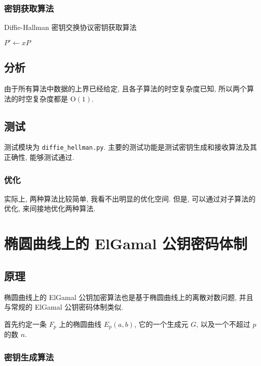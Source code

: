 \documentclass[12pt,a4paper]{article}
\begin{document}
\subsubsection*{密钥获取算法}

\begin{algorithm}[H]
\caption{Diffie-Hallman 密钥交换协议密钥获取算法}

$ P' \leftarrow x P $

\end{algorithm}

\subsection*{分析}

由于所有算法中数据的上界已经给定, 且各子算法的时空复杂度已知, 所以两个算法的时空复杂度都是 $ \mathrm{O}(1) $. 

\subsection*{测试}

测试模块为 \verb|diffie_hellman.py|. 主要的测试功能是测试密钥生成和接收算法及其正确性, 能够测试通过. 

\subsubsection*{优化}

实际上, 两种算法比较简单, 我看不出明显的优化空间. 但是, 可以通过对子算法的优化, 来间接地优化两种算法. 

\section*{椭圆曲线上的 ElGamal 公钥密码体制}

\subsection*{原理}

椭圆曲线上的 ElGamal 公钥加密算法也是基于椭圆曲线上的离散对数问题, 并且与常规的 ElGamal 公钥密码体制类似. 

首先约定一条 $ F_p $ 上的椭圆曲线 $ E_p(a, b) $, 它的一个生成元 $ G $, 以及一个不超过 $ p $ 的数 $ n $.  

\subsubsection*{密钥生成算法}
\end{document}

